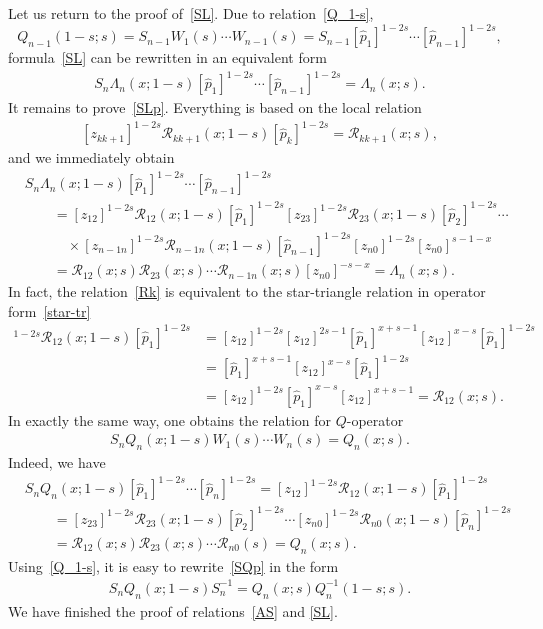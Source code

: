 \documentclass[10pt,a4paper]{amsart}
\numberwithin{equation}{section}
\begin{document}
Let us return to the proof of~\eqref{SL}.
Due to relation~\eqref{Q_1-s},
\begin{equation*}
Q_{n-1}(1-s; s) = S_{n-1} W_1(s) \cdots W_{n-1}(s) =
S_{n-1} [\hat{p}_1]^{1-2s}\cdots[\hat{p}_{n-1}]^{1-2s},
\end{equation*}
formula~\eqref{SL} can be rewritten in an equivalent form
 \begin{align}\label{SLp}
S_n \Lambda_n(x;1-s)
[\hat{p}_1]^{1-2s}\cdots[\hat{p}_{n-1}]^{1-2s} =
\Lambda_n(x;s) .
\end{align}
It remains to prove~\eqref{SLp}.
Everything is based on the local relation
\begin{align}\label{Rk}
[z_{k k+1}]^{1-2s} \mathcal{R}_{k k+1}(x;1-s) [\hat{p}_k]^{1-2s} = \mathcal{R}_{k k+1}(x;s) ,
\end{align}
and we immediately obtain
\begin{align*}
&
S_n \Lambda_n(x;1-s)
[\hat{p}_1]^{1-2s}\cdots[\hat{p}_{n-1}]^{1-2s} \\
& \qquad =
[z_{12}]^{1-2s} \mathcal{R}_{12}(x;1-s) [\hat{p}_1]^{1-2s}
[z_{23}]^{1-2s} \mathcal{R}_{23}(x;1-s) [\hat{p}_2]^{1-2s} \cdots \\
& \qquad\quad \times
[z_{n-1 n}]^{1-2s} \mathcal{R}_{n-1 n}(x;1-s)
[\hat{p}_{n-1}]^{1-2s} [z_{n0}]^{1-2s} [z_{n0}]^{s-1-x} \\
& \qquad =
\mathcal{R}_{12}(x;s) \mathcal{R}_{23}(x;s) \cdots
\mathcal{R}_{n-1 n}(x;s) [z_{n0}]^{-s-x} = \Lambda_n(x;s) .
\end{align*}
In fact, the relation~\eqref{Rk} is equivalent to the star-triangle
relation in operator form~\eqref{star-tr}
\begin{align*}
[z_{12}]^{1-2s} \mathcal{R}_{12}(x;1-s) [\hat{p}_1]^{1-2s} &=
[z_{12}]^{1-2s} [z_{12}]^{2s-1} [\hat{p}_1]^{x+s-1} [z_{12}]^{x-s}
 [\hat{p}_1]^{1-2s} \\
& =
[\hat{p}_1]^{x+s-1} [z_{12}]^{x-s}
 [\hat{p}_1]^{1-2s} \\
 &= [z_{12}]^{1-2s} [\hat{p}_1]^{x-s} [z_{12}]^{x+s-1} = \mathcal{R}_{12}(x;s) .
\end{align*}
In exactly the same way, one obtains the
relation for $Q$-operator
\begin{align}\label{SQp}
S_n Q_n(x;1-s) W_1(s) \cdots W_{n}(s) =
Q_n(x;s).
\end{align}
Indeed, we have
\begin{align*}
&S_n Q_n(x;1-s)
[\hat{p}_1]^{1-2s}\cdots[\hat{p}_{n}]^{1-2s}=
[z_{12}]^{1-2s} \mathcal{R}_{12}(x;1-s) [\hat{p}_1]^{1-2s} \\
& \qquad =
[z_{23}]^{1-2s} \mathcal{R}_{23}(x;1-s) [\hat{p}_2]^{1-2s} \cdots
[z_{n 0}]^{1-2s} \mathcal{R}_{n 0}(x;1-s)
[\hat{p}_{n}]^{1-2s} \\
& \qquad =
\mathcal{R}_{12}(x;s) \mathcal{R}_{23}(x;s) \cdots
\mathcal{R}_{n 0}(s) = Q_n(x;s) .
\end{align*}
Using~\eqref{Q_1-s}, it is easy to rewrite~\eqref{SQp} in the form
\begin{align*}
S_n Q_n(x;1-s) S^{-1}_{n} =
Q_n(x;s) Q^{-1}_{n}(1-s;s) .
\end{align*}
We have finished the proof
of relations~\eqref{AS} and \eqref{SL}.
\end{document}
